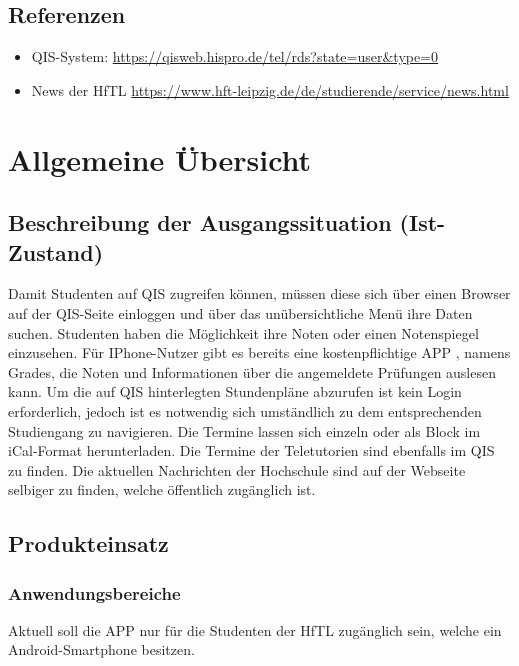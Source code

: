 \subsection{\textbf{Referenzen}}

\begin{itemize}		
	\item QIS-System:  \url{https://qisweb.hispro.de/tel/rds?state=user&type=0} 
	
	\item News der HfTL  \url{https://www.hft-leipzig.de/de/studierende/service/news.html}	
\end{itemize}


\section{Allgemeine Übersicht}

\subsection{\textbf{Beschreibung der Ausgangssituation (Ist-Zustand) }}

Damit Studenten auf \acs{QIS} zugreifen können, müssen diese sich über einen Browser auf der \acs{QIS}-Seite einloggen und über das unübersichtliche Menü ihre Daten suchen.
Studenten haben die Möglichkeit ihre Noten oder einen Notenspiegel einzusehen.
Für IPhone-Nutzer gibt es bereits eine kostenpflichtige \acs{APP} , namens Grades, die Noten und Informationen über die angemeldete Prüfungen auslesen kann.
Um die auf \acs{QIS} hinterlegten Stundenpläne abzurufen ist kein Login erforderlich, jedoch ist es notwendig sich umständlich zu dem entsprechenden Studiengang zu navigieren. Die Termine lassen sich einzeln oder als Block im \acs{iCal}-Format herunterladen. Die Termine der Teletutorien sind ebenfalls im QIS zu finden.
Die aktuellen Nachrichten der Hochschule sind auf der Webseite selbiger zu finden, welche öffentlich zugänglich ist.


\subsection{\textbf{Produkteinsatz}}

\subsubsection{Anwendungsbereiche}
Aktuell soll die APP nur für die Studenten der \acs{HfTL} zugänglich sein, welche ein Android-Smartphone besitzen. 

